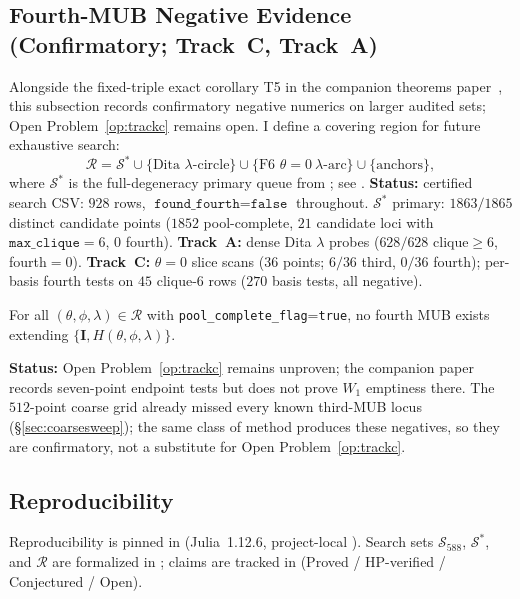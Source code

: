 \documentclass[onecolumn]{IEEEtran}
\begin{document}
\subsection{Fourth-MUB Negative Evidence (Confirmatory; Track~C, Track~A)}
\label{sec:trackc}
Alongside the fixed-triple exact corollary T5 in the companion theorems paper~\cite{JaupiTheorems2026}, this subsection records confirmatory negative numerics on larger audited sets; Open Problem~\ref{op:trackc} remains open.
I define a covering region for future exhaustive search:
\[
\mathcal{R}=\mathcal{S}^*\cup\{\text{Dita }\lambda\text{-circle}\}\cup\{\text{F6 }\theta=0\ \lambda\text{-arc}\}\cup\{\text{anchors}\},
\]
where $\mathcal{S}^*$ is the full-degeneracy primary queue from ; see .
\textbf{Status:} certified search CSV: $928$ rows, $\texttt{found\_fourth}=\texttt{false}$ throughout.
$\mathcal{S}^*$ primary: $1863/1865$ distinct candidate points ($1852$ pool-complete, $21$ candidate loci with $\texttt{max\_clique}=6$, $0$ fourth).
\textbf{Track~A:} dense Dita $\lambda$ probes ($628/628$ clique$\ge6$, fourth$=0$).
\textbf{Track~C:} $\theta{=}0$ slice scans ($36$ points; $6/36$ third, $0/36$ fourth); per-basis fourth tests on $45$ clique-$6$ rows ($270$ basis tests, all negative).

\begin{conjecture}
\label{op:trackc}
For all $(\theta,\phi,\lambda)\in\mathcal{R}$ with \texttt{pool\_complete\_flag}=\texttt{true}, no fourth MUB exists extending $\{\mathbf{I},H(\theta,\phi,\lambda)\}$.
\end{conjecture}
\noindent
\textbf{Status:} Open Problem~\ref{op:trackc} remains unproven; the companion paper~\cite{JaupiTheorems2026} records seven-point endpoint tests but does not prove $W_1$ emptiness there.
The $512$-point coarse grid already missed every known third-MUB locus (\S\ref{sec:coarsesweep}); the same class of method produces these negatives, so they are confirmatory, not a substitute for Open Problem~\ref{op:trackc}.

\subsection{Reproducibility}
\label{sec:infra}
Reproducibility is pinned in  (Julia~1.12.6, project-local ).
Search sets $\mathcal{S}_{588}$, $\mathcal{S}^*$, and $\mathcal{R}$ are formalized in ; claims are tracked in  (Proved / HP-verified / Conjectured / Open).
\end{document}
